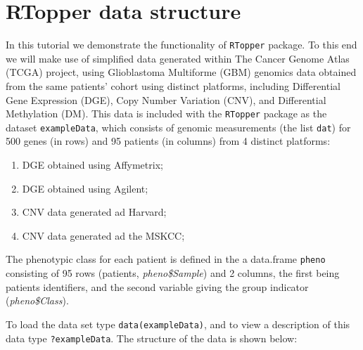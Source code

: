 \documentclass[11pt]{article}
\newcommand{\Robject}[1]{{\texttt{#1}}}
\newcommand{\Rpackage}[1]{{\texttt{#1}}}
\begin{document}
\section{RTopper data structure}
In this tutorial we demonstrate the functionality of \Rpackage{RTopper} package.
To this end we will make use of simplified data generated within 
The Cancer Genome Atlas (TCGA) project,
using Glioblastoma Multiforme (GBM) genomics data obtained from the same
patients' cohort using distinct platforms, including Differential Gene Expression (DGE),
Copy Number Variation (CNV), and Differential Methylation (DM).
This data is included with the \Rpackage{RTopper} package as the dataset \texttt{exampleData},
which consists of genomic measurements (the list \Robject{dat}) 
for 500 genes (in rows) and 95 patients (in columns) from 4 distinct platforms:
\begin{enumerate}
  \item DGE obtained using Affymetrix;
  \item DGE obtained using Agilent;
  \item CNV data generated ad Harvard;
  \item CNV data generated ad the MSKCC;
\end{enumerate}

The phenotypic class for each patient is defined in the a data.frame \Robject{pheno}
consisting of 95 rows (patients, {\it pheno\$Sample}) and 2 columns, the first being patients identifiers,
and the second variable giving the group indicator ({\it pheno\$Class}).

To load the data set type \texttt{data(exampleData)}, and to view a description of this 
data type \texttt{?exampleData}. The structure of the data is shown below:
\end{document}

